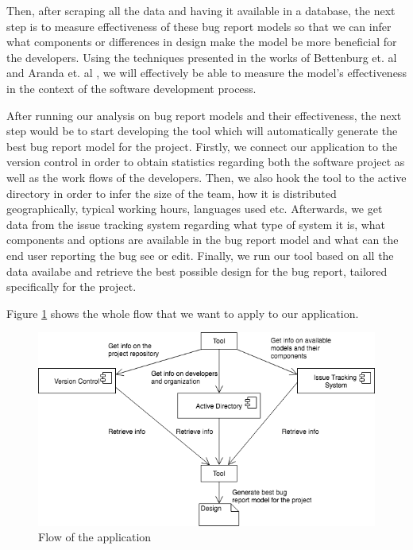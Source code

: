 \documentclass[11pt,english,twocolumn]{article}
\begin{document}
Then, after scraping all the data and having it available in a database, the next step is
to measure effectiveness of these bug report models so that we can infer what components
or differences in design make the model be more beneficial for the developers. Using the
techniques presented in the works of Bettenburg et. al \cite{bettenburg2008makes} and 
Aranda et. al \cite{aranda2009secret}, we will effectively be able to measure the model's 
effectiveness in the context of the software development process.

After running our analysis on bug report models and their effectiveness, the next step
would be to start developing the tool which will automatically generate the best bug
report model for the project. Firstly, we connect our application to the version control
in order to obtain statistics regarding both the software project as well as the work flows
of the developers. Then, we also hook the tool to the active directory in order to infer the
size of the team, how it is distributed geographically, typical working hours, languages used
etc. Afterwards, we get data from the issue tracking system regarding what type of system it is,
what components and options are available in the bug report model and what can the end user 
reporting the bug see or edit. Finally, we run our tool based on all the data availabe 
and retrieve the best possible design for the bug report, tailored specifically for the project.

Figure \ref{diagram} shows the whole flow that we want 
to apply to our application.

\begin{figure}
	\centering
	\includegraphics[width=\linewidth]{diagram}
	\caption{Flow of the application}
	\label{diagram}
\end{figure}
\end{document}
